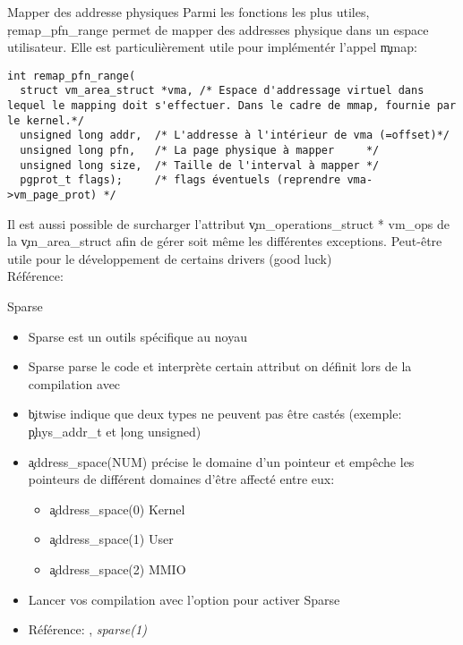 \begin{frame}[fragile=singleslide]{Mapper des addresse physiques}
  Parmi les  fonctions les plus utiles,  \c{remap_pfn_range} permet de
  mapper des  addresses physique dans un espace  utilisateur. Elle est
  particulièrement utile pour implémentér l'appel \c{mmap}:
  \begin{lstlisting} 
int remap_pfn_range(
  struct vm_area_struct *vma, /* Espace d'addressage virtuel dans lequel le mapping doit s'effectuer. Dans le cadre de mmap, fournie par le kernel.*/
  unsigned long addr,  /* L'addresse à l'intérieur de vma (=offset)*/
  unsigned long pfn,   /* La page physique à mapper     */
  unsigned long size,  /* Taille de l'interval à mapper */
  pgprot_t flags);     /* flags éventuels (reprendre vma->vm_page_prot) */
  \end{lstlisting} 

  Il     est    aussi     possible     de    surcharger     l'attribut
  \c{vm_operations_struct *  vm_ops} de la  \c{vm_area_struct} afin de
  gérer soit même les différentes exceptions. Peut-être utile pour le
  développement de certains drivers (good luck) \\[2ex]

  Référence: 
\end{frame} 

\begin{frame}[fragile=singleslide]{Sparse}
  \begin{itemize} 
  \item Sparse est un outils spécifique au noyau
  \item Sparse parse le code et interprète certain attribut on définit
    lors de la compilation avec 
  \item \c{bitwise} indique que deux  types ne peuvent pas être castés
    (exemple: \c{phys_addr_t} et \c{long unsigned})
  \item  \c{address_space(NUM)} précise  le domaine  d'un  pointeur et
    empêche les  pointeurs de différent domaines  d'être affecté entre
    eux:
    \begin{itemize}
    \item \c{address_space(0)} Kernel
    \item \c{address_space(1)} User
    \item \c{address_space(2)} MMIO
    \end{itemize} 
  \item Lancer  vos compilation  avec l'option   pour activer
    Sparse
  \item Référence: , \emph{sparse(1)}
  \end{itemize} 
\end{frame} 

